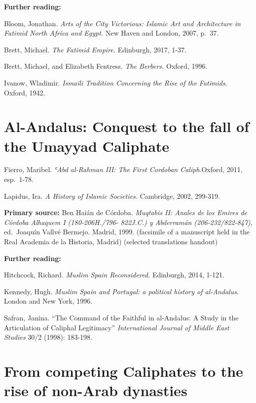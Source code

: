 \documentclass[
]{book}
\begin{document}
\textbf{Further reading:}

Bloom, Jonathan. \emph{Arts of the City Victorious: Islamic Art and Architecture in Fatimid North Africa and Egypt.} New Haven and London, 2007, p.~37.

Brett, Michael. \emph{The Fatimid Empire.} Edinburgh, 2017, 1-37.

Brett, Michael, and Elizabeth Fentress. \emph{The Berbers.} Oxford, 1996.

Ivanow, Wladimir. \emph{Ismaili Tradition Concerning the Rise of the Fatimids.} Oxford, 1942.

\hypertarget{al-andalus-conquest-to-the-fall-of-the-umayyad-caliphate}{%
\chapter{Al-Andalus: Conquest to the fall of the Umayyad Caliphate}\label{al-andalus-conquest-to-the-fall-of-the-umayyad-caliphate}}

Fierro, Maribel. \emph{ʿAbd al-Rahman III: The First Cordoban Caliph}.Oxford, 2011, esp.~1-78.

Lapidus, Ira. \emph{A History of Islamic Societies.} Cambridge, 2002,
299-319.

\textbf{Primary source:} Ben Haián de Córdoba. \emph{Muqtabis II: Anales de los Emires de Córdoba Alhaquem I (180-206H./796- 822J.C.) y Abderramán (206-232/822-847)}, ed.~Joaquín Vallvé Bermejo. Madrid, 1999. (facsimile of a manuscript held in the Real Academia de la Historia, Madrid) (selected translations handout)

\textbf{Further reading:}

Hitchcock, Richard. \emph{Muslim Spain Reconsidered.} Edinburgh, 2014, 1-121.

Kennedy, Hugh. \emph{Muslim Spain and Portugal: a political history of al-Andalus}. London and New York, 1996.

Safran, Janina. ``The Command of the Faithful in al-Andalus: A Study in
the Articulation of Caliphal Legitimacy'' \emph{International Journal of Middle East Studies} 30/2 (1998): 183-198.

\hypertarget{from-competing-caliphates-to-the-rise-of-non-arab-dynasties}{%
\chapter{From competing Caliphates to the rise of non-Arab dynasties}\label{from-competing-caliphates-to-the-rise-of-non-arab-dynasties}}
\end{document}
